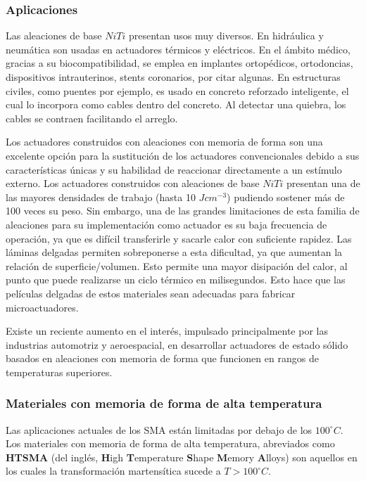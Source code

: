 \documentclass[12pt]{article}
\theoremstyle{definition}
\theoremstyle{remark}
\begin{document}
\subsubsection{Aplicaciones}
Las aleaciones de base $NiTi$ presentan usos muy diversos. En hidráulica y neumática son usadas en actuadores térmicos y eléctricos. En el ámbito médico, gracias a su biocompatibilidad, se emplea en implantes ortopédicos, ortodoncias, dispositivos intrauterinos, stents coronarios, por citar algunas. En estructuras civiles, como puentes por ejemplo, es usado en concreto reforzado inteligente, el cual lo incorpora como cables dentro del concreto. Al detectar una quiebra, los cables se contraen facilitando el arreglo\citep{Engineering}.

Los actuadores construidos con aleaciones con memoria de forma son una excelente opción para la sustitución de los actuadores convencionales debido a sus características únicas y su habilidad de reaccionar directamente a un estímulo externo. Los actuadores construidos con aleaciones de base $NiTi$ presentan una de las mayores densidades de trabajo (hasta 10 $J cm^{-3}$) pudiendo sostener más de 100 veces su peso. Sin embargo, una de las grandes limitaciones de esta familia de aleaciones para su implementación como actuador es su baja frecuencia de operación, ya que es difícil transferirle y sacarle calor con suficiente rapidez. Las láminas delgadas permiten sobreponerse a esta dificultad, ya que aumentan la relación de superficie/volumen. Esto permite una mayor disipación del calor, al punto que puede realizarse un ciclo térmico en milisegundos. Esto hace que las películas delgadas de estos materiales sean adecuadas para fabricar microactuadores\citep{ThinFilm}.

Existe un reciente aumento en el interés, impulsado principalmente por las industrias automotriz y aeroespacial, en desarrollar actuadores de estado sólido basados en aleaciones con memoria de forma que funcionen en rangos de temperaturas superiores.

\subsubsection{Materiales con memoria de forma de alta temperatura}

Las aplicaciones actuales de los SMA están limitadas por debajo de los $100^\circ C$. Los materiales con memoria de forma de alta temperatura, abreviados como \textbf{HTSMA} (del inglés, \textbf{H}igh \textbf{T}emperature \textbf{S}hape \textbf{M}emory \textbf{A}lloys) son aquellos en los cuales la transformación martensítica sucede a $T > 100^\circ C$.
\end{document}
